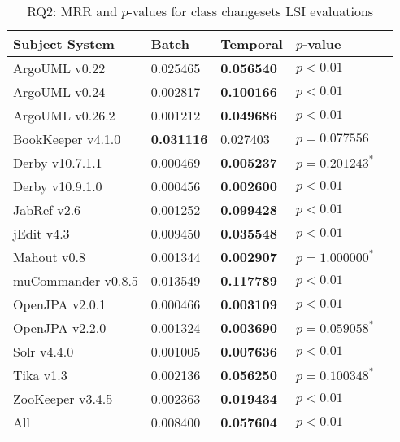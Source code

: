 
\begin{table}[t]
\renewcommand{\arraystretch}{1.3}
\footnotesize
\centering
\caption{RQ2: MRR and $p$-values for class changesets LSI evaluations}
\begin{tabular}{l|ll|ll}
   \toprule
    Subject System & Batch           & Temporal        & $p$-value          \\
    \midrule

ArgoUML v0.22      & 0.025465        & {\bf 0.056540 } & $p < 0.01$         \\
ArgoUML v0.24      & 0.002817        & {\bf 0.100166 } & $p < 0.01$         \\
ArgoUML v0.26.2    & 0.001212        & {\bf 0.049686 } & $p < 0.01$         \\
BookKeeper v4.1.0  & {\bf 0.031116 } & 0.027403        & $p = 0.077556$     \\
Derby v10.7.1.1    & 0.000469        & {\bf 0.005237 } & $p = 0.201243^{*}$ \\
Derby v10.9.1.0    & 0.000456        & {\bf 0.002600 } & $p < 0.01$         \\
JabRef v2.6        & 0.001252        & {\bf 0.099428 } & $p < 0.01$         \\
jEdit v4.3         & 0.009450        & {\bf 0.035548 } & $p < 0.01$         \\
Mahout v0.8        & 0.001344        & {\bf 0.002907 } & $p = 1.000000^{*}$ \\
muCommander v0.8.5 & 0.013549        & {\bf 0.117789 } & $p < 0.01$         \\
OpenJPA v2.0.1     & 0.000466        & {\bf 0.003109 } & $p < 0.01$         \\
OpenJPA v2.2.0     & 0.001324        & {\bf 0.003690 } & $p = 0.059058^{*}$ \\
Solr v4.4.0        & 0.001005        & {\bf 0.007636 } & $p < 0.01$         \\
Tika v1.3          & 0.002136        & {\bf 0.056250 } & $p = 0.100348^{*}$ \\
ZooKeeper v3.4.5   & 0.002363        & {\bf 0.019434 } & $p < 0.01$         \\
\midrule
All                & 0.008400        & {\bf 0.057604 } & $p < 0.01$         \\

    \bottomrule
\end{tabular}
\label{table:rq2:class:lsi}
\end{table}

